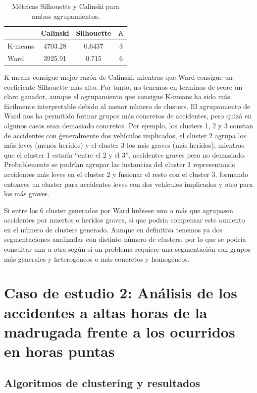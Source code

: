 \documentclass[oneside]{book}
\begin{document}
\begin{table}[H]
  \centering
  \begin{tabular}{|l|ccc|} \hline & Calinski & Silhouette & $K$ \\
    \hline K-means & 4703.28 & 0.6437 & 3 \\ \hline Ward & 3925.91 &
    0.715 & 6 \\ \hline
  \end{tabular}
  \caption{Métricas Silhouette y Calinski para ambos agrupamientos.}
  \label{tab:comp-scores1}
\end{table}

K-means consigue mejor razón de Calinski, mientras que Ward consigue
un coeficiente Silhouette más alto. Por tanto, no tenemos en terminos
de score un claro ganador, aunque el agrupamiento que consigue K-means
ha sido más fácilmente interpretable debido al menor número de
clusters. El agrupamiento de Ward nos ha permitido formar grupos más
concretos de accidentes, pero quizá en algunos casos sean demasiado
concretos. Por ejemplo, los clusters 1, 2 y 3 constan de accidentes
con ǵeneralmente dos vehículos implicados, el cluster 2 agrupa los más
leves (menos heridos) y el cluster 3 los más graves (más heridos),
mientras que el cluster 1 estaría ``entre el 2 y el 3'', accidentes
graves pero no demasiado. Probablemente se podrían agrupar las
instancias del cluster 1 representando accidentes más leves en el
cluster 2 y fusionar el resto con el cluster 3, formando entonces un
cluster para accidentes leves con dos vehículos implicados y otro para
los más graves.

Si entre los 6 cluster generados por Ward hubiese uno o más que
agrupasen accidentes por muertos o heridos graves, sí que podría
compensar este aumento en el número de clusters generado. Aunque en
definitiva tenemos ya dos segmentaciones analizadas con distinto
número de clusters, por lo que se podría consultar una u otra según si
un problema requiere una segmentación con grupos más generales y
heterogéneos o más concretos y homogéneos.

\section{Caso de estudio 2: Análisis de los accidentes a altas horas
  de la madrugada frente a los ocurridos en horas puntas}



\subsection{Algoritmos de clustering y resultados}
\end{document}
